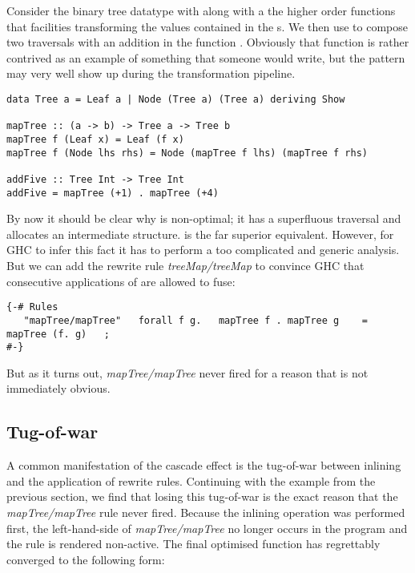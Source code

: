 Consider the binary tree datatype  with along with a the higher order  functions that
facilities transforming the values contained in the s. We then use  to compose two
traversals with an addition in the function . Obviously that function is rather contrived as
an example of something that someone would write, but the pattern may very well show up during the transformation pipeline.


\begin{listing}[H]
\begin{verbatim}
data Tree a = Leaf a | Node (Tree a) (Tree a) deriving Show

mapTree :: (a -> b) -> Tree a -> Tree b
mapTree f (Leaf x) = Leaf (f x)
mapTree f (Node lhs rhs) = Node (mapTree f lhs) (mapTree f rhs)

addFive :: Tree Int -> Tree Int
addFive = mapTree (+1) . mapTree (+4)
\end{verbatim}
\end{listing}

By now it should be clear why  is non-optimal; it has a superfluous traversal and allocates an
intermediate structure.  is the far superior equivalent. However, for GHC to infer this fact
it has to perform a too complicated and generic analysis. But we can add the rewrite rule \textit{treeMap/treeMap}
to convince GHC that consecutive applications of  are allowed to fuse:

\begin{verbatim}
{-# Rules
   "mapTree/mapTree"   forall f g.   mapTree f . mapTree g    = mapTree (f. g)   ;
#-}
\end{verbatim}

But as it turns out, \textit{mapTree/mapTree} never fired for a reason that is not immediately obvious.

\subsection{Tug-of-war}
\label{section:introduction:tug_of_war}

A common manifestation of the cascade effect is the tug-of-war between inlining and the application
of rewrite rules. Continuing with the  example from the previous section, we find that losing this
tug-of-war is the exact reason that the \textit{mapTree/mapTree} rule never fired. Because the inlining operation
was performed first, the left-hand-side of \textit{mapTree/mapTree} no longer occurs in the program and the rule
is rendered non-active. The final optimised function has regrettably converged to the following form:

